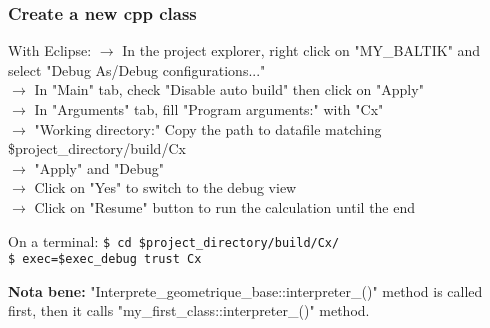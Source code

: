 \documentclass[10pt, hyperref={unicode=true,pdfusetitle, bookmarks=true,bookmarksnumbered=false,bookmarksopen=false, breaklinks=false,pdfborder={0 0 1},backref=true,colorlinks=true,linkcolor=darkblue,pageanchor, urlcolor=darkblue}]{beamer}
\begin{document}
\begin{frame}
\frametitle{Create a new cpp class}

\begin{exampleblock}{With Eclipse:}
    $\rightarrow$ In the project explorer, right click on "MY\_BALTIK" and select "Debug As/Debug configurations..." \\
    $\rightarrow$ In "Main" tab, check "Disable auto build" then click on "Apply"\\
    $\rightarrow$ In "Arguments" tab, fill "Program arguments:" with "Cx"\\
    $\rightarrow$ "Working directory:" Copy the path to datafile matching \$project\_directory/build/Cx\\
    $\rightarrow$ "Apply" and "Debug"\\
    $\rightarrow$ Click on "Yes" to switch to the debug view\\
    $\rightarrow$ Click on "Resume" button to run the calculation until the end\\
\end{exampleblock}    

\begin{block}{On a terminal:}
    \texttt{\$ cd \$project\_directory/build/Cx/}\\
    \texttt{\$ exec=\$exec\_debug trust Cx}\\
\end{block}    
    
\begin{block}{}
\textbf{Nota bene:} "Interprete\_geometrique\_base::interpreter\_()" method is called first,
then it calls "my\_first\_class::interpreter\_()" method.
\end{block}

\end{frame}
\end{document}

